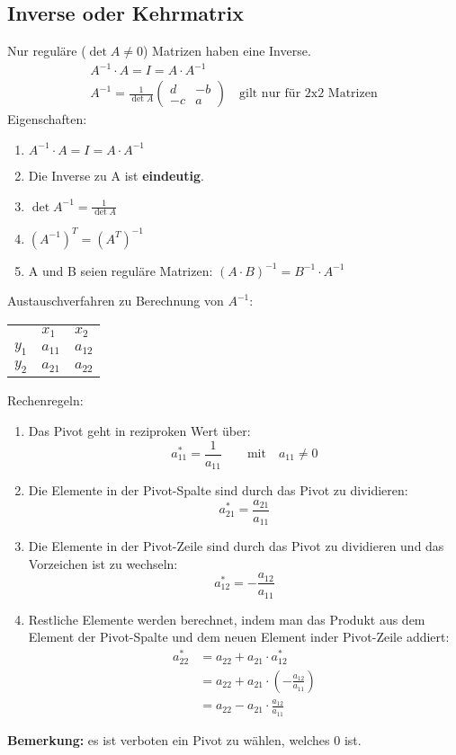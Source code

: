 \subsection{Inverse oder Kehrmatrix}
Nur regul\"are ($\det{A}\neq 0$) Matrizen haben eine Inverse.
\begin{gather}
  A^{-1} \cdot A = I = A \cdot A^{-1} \\
  A^{-1} = \frac{1}{\det{A}}\begin{pmatrix}d & -b \\ -c & a\end{pmatrix} \quad\text{gilt nur f\"ur 2x2 Matrizen}
\end{gather}
Eigenschaften:
\begin{enumerate}
  \item $A^{-1}\cdot A = I = A\cdot A^{-1}$
  \item Die Inverse zu A ist \textbf{eindeutig}.
  \item $\det{A^{-1}} = \frac{1}{\det{A}}$
  \item ${(A^{-1})}^T = {(A^T)}^{-1}$
  \item A und B seien regul\"are Matrizen: $(A\cdot B)^{-1} = B^{-1} \cdot A^{-1}$
\end{enumerate}
Austauschverfahren zu Berechnung von $A^{-1}$:
\begin{tabular}{p{1.5cm} p{1.5cm} p{1.5cm}}
  & $x_1$ & $x_2$ \\
  $y_1$ & $a_{11}$ & $a_{12}$ \\
  $y_2$ & $a_{21}$ & $a_{22}$ \\
\end{tabular}
Rechenregeln:
\begin{enumerate}
  \item Das Pivot geht in reziproken Wert \"uber:
	\begin{equation*}
		a_{11}^* = \frac{1}{a_{11}} \qquad\text{mit}\quad a_{11}\neq 0
	\end{equation*}
  \item Die Elemente in der Pivot-Spalte sind durch das Pivot zu dividieren:
	\begin{equation*}
		a_{21}^* = \frac{a_{21}}{a_{11}}
	\end{equation*}
  \item Die Elemente in der Pivot-Zeile sind durch das Pivot zu dividieren und
	das Vorzeichen ist zu wechseln:
	\begin{equation*}
		a_{12}^* = -\frac{a_{12}}{a_{11}}
	\end{equation*}
  \item Restliche Elemente werden berechnet, indem man das Produkt aus
	dem Element der Pivot-Spalte und dem neuen Element inder Pivot-Zeile
	addiert:
	\begin{align*}
		a_{22}^* &= a_{22} + a_{21}\cdot a_{12}^* \\
		&= a_{22} + a_{21}\cdot\left({-\frac{a_{12}}{a_{11}}}\right) \\
		&= a_{22} - a_{21}\cdot\frac{a_{12}}{a_{11}}
	\end{align*}
\end{enumerate}
\textbf{Bemerkung:} es ist verboten ein Pivot zu w\"ahlen, welches 0 ist.


